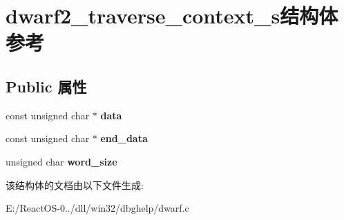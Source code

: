 \hypertarget{structdwarf2__traverse__context__s}{}\section{dwarf2\+\_\+traverse\+\_\+context\+\_\+s结构体 参考}
\label{structdwarf2__traverse__context__s}
\subsection*{Public 属性}
\begin{DoxyCompactItemize}
\item 
\mbox{\label{structdwarf2__traverse__context__s_ab9cdfad30f6e69ac02efdff79912d9ab}} 
const unsigned char $\ast$ {\bfseries data}
\item 
\mbox{\label{structdwarf2__traverse__context__s_a9e054e038f3c8d400b24b6dac8b0e99e}} 
const unsigned char $\ast$ {\bfseries end\+\_\+data}
\item 
\mbox{\label{structdwarf2__traverse__context__s_a4009395177ac0f72fc53d197f1c42134}} 
unsigned char {\bfseries word\+\_\+size}
\end{DoxyCompactItemize}


该结构体的文档由以下文件生成\+:\begin{DoxyCompactItemize}
\item 
E\+:/\+React\+O\+S-\/0../dll/win32/dbghelp/dwarf.\+c\end{DoxyCompactItemize}
